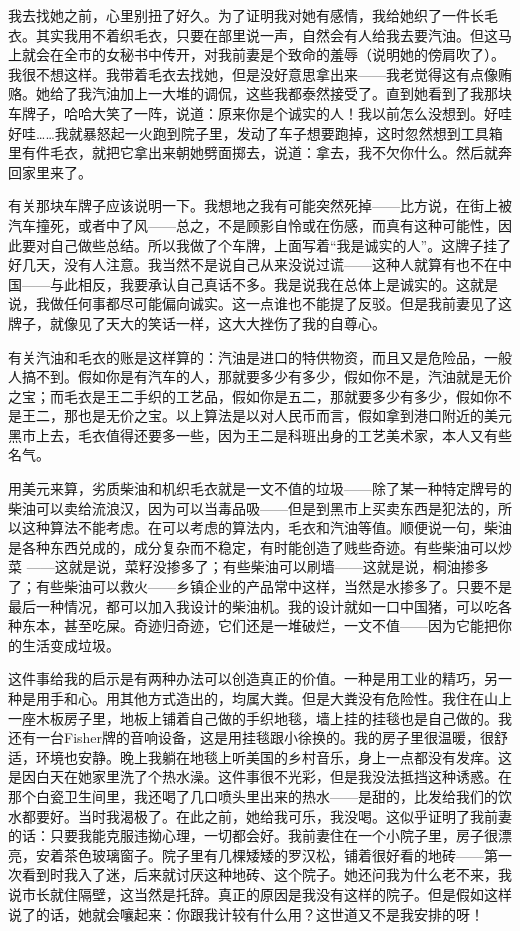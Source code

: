 我去找她之前，心里别扭了好久。为了证明我对她有感情，我给她织了一件长毛衣。其实我用不着织毛衣，只要在部里说一声，自然会有人给我去要汽油。但这马上就会在全市的女秘书中传开，对我前妻是个致命的羞辱（说明她的傍肩吹了）。我很不想这样。我带着毛衣去找她，但是没好意思拿出来——我老觉得这有点像贿赂。她给了我汽油加上一大堆的调侃，这些我都泰然接受了。直到她看到了我那块车牌子，哈哈大笑了一阵，说道：原来你是个诚实的人！我以前怎么没想到。好哇好哇……我就暴怒起一火跑到院子里，发动了车子想要跑掉，这时忽然想到工具箱里有件毛衣，就把它拿出来朝她劈面掷去，说道：拿去，我不欠你什么。然后就奔回家里来了。 

有关那块车牌子应该说明一下。我想地之我有可能突然死掉——比方说，在街上被汽车撞死，或者中了风——总之，不是顾影自怜或在伤感，而真有这种可能性，因此要对自己做些总结。所以我做了个车牌，上面写着“我是诚实的人”。这牌子挂了好几天，没有人注意。我当然不是说自己从来没说过谎——这种人就算有也不在中国——与此相反，我要承认自己真话不多。我是说我在总体上是诚实的。这就是说，我做任何事都尽可能偏向诚实。这一点谁也不能提了反驳。但是我前妻见了这牌子，就像见了天大的笑话一样，这大大挫伤了我的自尊心。 



有关汽油和毛衣的账是这样算的：汽油是进口的特供物资，而且又是危险品，一般人搞不到。假如你是有汽车的人，那就要多少有多少，假如你不是，汽油就是无价之宝；而毛衣是王二手织的工艺品，假如你是五二，那就要多少有多少，假如你不是王二，那也是无价之宝。以上算法是以对人民币而言，假如拿到港口附近的美元黑市上去，毛衣值得还要多一些，因为王二是科班出身的工艺美术家，本人又有些名气。 

用美元来算，劣质柴油和机织毛衣就是一文不值的垃圾——除了某一种特定牌号的柴油可以卖给流浪汉，因为可以当毒品吸——但是到黑市上买卖东西是犯法的，所以这种算法不能考虑。在可以考虑的算法内，毛衣和汽油等值。顺便说一句，柴油是各种东西兑成的，成分复杂而不稳定，有时能创造了贱些奇迹。有些柴油可以炒菜 ——这就是说，菜籽没掺多了；有些柴油可以刷墙——这就是说，桐油掺多了；有些柴油可以救火——乡镇企业的产品常中这样，当然是水掺多了。只要不是最后一种情况，都可以加入我设计的柴油机。我的设计就如一口中国猪，可以吃各种东本，甚至吃屎。奇迹归奇迹，它们还是一堆破烂，一文不值——因为它能把你的生活变成垃圾。 

这件事给我的启示是有两种办法可以创造真正的价值。一种是用工业的精巧，另一种是用手和心。用其他方式造出的，均属大粪。但是大粪没有危险性。我住在山上一座木板房子里，地板上铺着自己做的手织地毯，墙上挂的挂毯也是自己做的。我还有一台Fisher牌的音响设备，这是用挂毯跟小徐换的。我的房子里很温暖，很舒适，环境也安静。晚上我躺在地毯上听美国的乡村音乐，身上一点都没有发痒。这是因白天在她家里洗了个热水澡。这件事很不光彩，但是我没法抵挡这种诱惑。在那个白瓷卫生间里，我还喝了几口喷头里出来的热水——是甜的，比发给我们的饮水都要好。当时我渴极了。在此之前，她给我可乐，我没喝。这似乎证明了我前妻的话：只要我能克服违拗心理，一切都会好。我前妻住在一个小院子里，房子很漂亮，安着茶色玻璃窗子。院子里有几棵矮矮的罗汉松，铺着很好看的地砖——第一次看到时我入了迷，后来就讨厌这种地砖、这个院子。她还问我为什么老不来，我说市长就住隔壁，这当然是托辞。真正的原因是我没有这样的院子。但是假如这样说了的话，她就会嚷起来：你跟我计较有什么用？这世道又不是我安排的呀！ 



